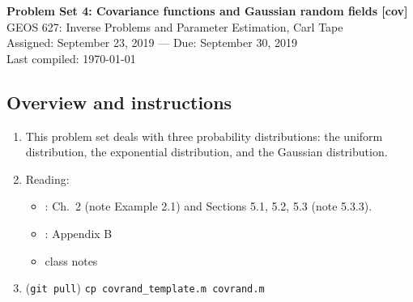\documentclass[11pt,titlepage,fleqn]{article}
\begin{document}

\begin{spacing}{1.2}
\centering
{\large \bf Problem Set 4: Covariance functions and Gaussian random fields [cov]} \\
GEOS 627: Inverse Problems and Parameter Estimation, Carl Tape \\
Assigned: September 23, 2019 --- Due: September 30, 2019 \\
Last compiled: \today
\end{spacing}


\subsection*{Overview and instructions}

\begin{enumerate}
\item This problem set deals with three probability distributions: the uniform distribution, the exponential distribution, and the Gaussian distribution.

\item Reading:
\begin{itemize}
\item \citet{Tarantola2005}: Ch.~2 (note Example 2.1) and Sections 5.1, 5.2, 5.3 (note 5.3.3).
\item \citet{AsterE2}: Appendix B
\item class notes
\end{itemize}

\item (\verb+git pull+) \verb+cp covrand_template.m covrand.m+

\end{enumerate}

\end{document}
